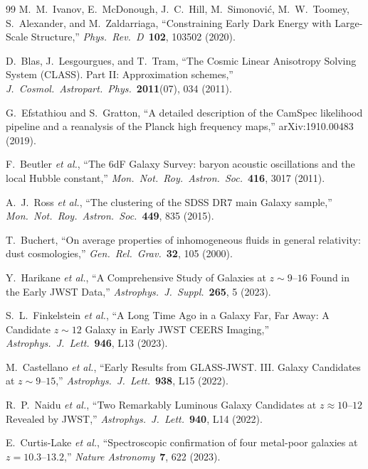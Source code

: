 \documentclass[aps,prd,twocolumn,superscriptaddress,nofootinbib]{revtex4-2}
\begin{document}
\begin{thebibliography}{99}
M.~M.~Ivanov, E.~McDonough, J.~C.~Hill, M.~Simonovi\'c,
M.~W.~Toomey, S.~Alexander, and M.~Zaldarriaga,
``Constraining Early Dark Energy with Large-Scale Structure,''
\emph{Phys.\ Rev.\ D}\ \textbf{102}, 103502 (2020).

D.~Blas, J.~Lesgourgues, and T.~Tram,
``The Cosmic Linear Anisotropy Solving System (CLASS). Part II:
Approximation schemes,''
\emph{J.\ Cosmol.\ Astropart.\ Phys.}\ \textbf{2011}(07), 034 (2011).

G.~Efstathiou and S.~Gratton,
``A detailed description of the CamSpec likelihood pipeline and a
reanalysis of the Planck high frequency maps,''
arXiv:1910.00483 (2019).

F.~Beutler \emph{et al.},
``The 6dF Galaxy Survey: baryon acoustic oscillations and the local
Hubble constant,''
\emph{Mon.\ Not.\ Roy.\ Astron.\ Soc.}\ \textbf{416}, 3017 (2011).

A.~J.~Ross \emph{et al.},
``The clustering of the SDSS DR7 main Galaxy sample,''
\emph{Mon.\ Not.\ Roy.\ Astron.\ Soc.}\ \textbf{449}, 835 (2015).

T.~Buchert,
``On average properties of inhomogeneous fluids in general relativity:
dust cosmologies,''
\emph{Gen.\ Rel.\ Grav.}\ \textbf{32}, 105 (2000).

Y.~Harikane \emph{et al.},
``A Comprehensive Study of Galaxies at $z \sim 9$--$16$ Found in the
Early JWST Data,''
\emph{Astrophys.\ J.\ Suppl.}\ \textbf{265}, 5 (2023).

S.~L.~Finkelstein \emph{et al.},
``A Long Time Ago in a Galaxy Far, Far Away: A Candidate $z \sim 12$
Galaxy in Early JWST CEERS Imaging,''
\emph{Astrophys.\ J.\ Lett.}\ \textbf{946}, L13 (2023).

M.~Castellano \emph{et al.},
``Early Results from GLASS-JWST. III. Galaxy Candidates at
$z \sim 9$--$15$,''
\emph{Astrophys.\ J.\ Lett.}\ \textbf{938}, L15 (2022).

R.~P.~Naidu \emph{et al.},
``Two Remarkably Luminous Galaxy Candidates at $z \approx 10$--$12$
Revealed by JWST,''
\emph{Astrophys.\ J.\ Lett.}\ \textbf{940}, L14 (2022).

E.~Curtis-Lake \emph{et al.},
``Spectroscopic confirmation of four metal-poor galaxies at
$z = 10.3$--$13.2$,''
\emph{Nature Astronomy}\ \textbf{7}, 622 (2023).


\end{thebibliography}
\end{document}
